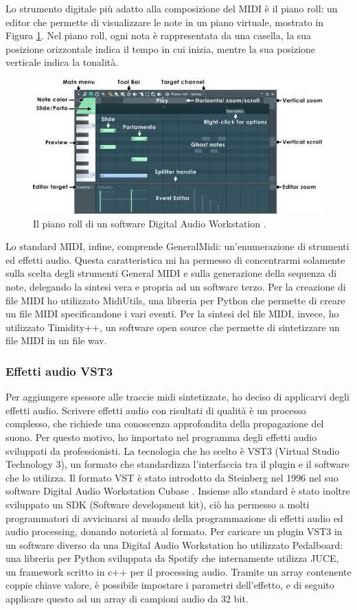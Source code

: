Lo strumento digitale più adatto alla composizione del MIDI è il piano roll: un editor che permette di visualizzare le note in un piano virtuale, mostrato in Figura \ref{fig:pianoroll}. 
Nel piano roll, ogni nota è rappresentata da una casella, la sua posizione orizzontale indica il tempo in cui inizia, mentre la sua posizione verticale indica la tonalità.
\begin{figure}[H]
    \includegraphics[width=\linewidth,scale=0.2]{img/pianoroll.png}
    \caption{Il piano roll di un software Digital Audio Workstation \cite{pianoroll_img}.}
    \label{fig:pianoroll}
\end{figure}
Lo standard MIDI, infine, comprende GeneralMidi: un'enumerazione di strumenti ed effetti audio.
Questa caratteristica mi ha permesso di concentrarmi solamente sulla scelta degli strumenti General MIDI e sulla generazione della sequenza di note, delegando la sintesi vera e propria ad un software terzo.
Per la creazione di file MIDI ho utilizzato MidiUtils, una libreria per Python che permette di creare un file MIDI specificandone i vari eventi.
Per la sintesi del file MIDI, invece, ho utilizzato Timidity++, un software open source che permette di sintetizzare un file MIDI in un file wav.
\subsubsection{Effetti audio VST3}
Per aggiungere spessore alle traccie midi sintetizzate, ho deciso di applicarvi degli effetti audio.
Scrivere effetti audio con risultati di qualità è un processo complesso, che richiede una conoscenza approfondita della propagazione del suono.
Per questo motivo, ho importato nel programma degli effetti audio sviluppati da professionisti.
La tecnologia che ho scelto è VST3 (Virtual Studio Technology 3), un formato che standardizza l'interfaccia tra il plugin e il software che lo utilizza.
Il formato VST è stato introdotto da Steinberg nel 1996 nel suo software Digital Audio Workstation Cubase \cite{vst3}. Insieme allo standard è stato inoltre sviluppato un SDK (Software development kit), ciò ha permesso a molti programmatori
di avvicinarsi al mondo della programmazione di effetti audio ed audio processing, donando notorietà al formato.
Per caricare un plugin VST3 in un software diverso da una Digital Audio Workstation ho utilizzato Pedalboard: una libreria per Python sviluppata da Spotify che internamente utilizza JUCE, un framework scritto in c++ per il processing audio.
Tramite un array contenente coppie chiave valore, è possibile impostare i parametri dell'effetto, e di seguito applicare questo ad un array di campioni audio da 32 bit.
